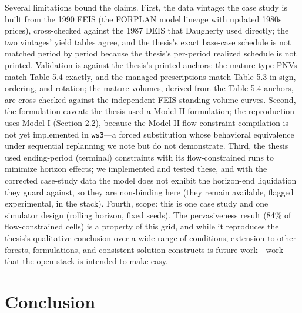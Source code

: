 \documentclass[12pt]{article}
\begin{document}
Several limitations bound the claims. First, the data vintage: the case study is built from the 1990 FEIS (the FORPLAN model lineage with updated 1980s prices), cross-checked against the 1987 DEIS that Daugherty used directly; the two vintages' yield tables agree, and the thesis's exact base-case schedule is not matched period by period because the thesis's per-period realized schedule is not printed. Validation is against the thesis's printed anchors: the mature-type PNVs match Table 5.4 exactly, and the managed prescriptions match Table 5.3 in sign, ordering, and rotation; the mature volumes, derived from the Table 5.4 anchors, are cross-checked against the independent FEIS standing-volume curves. Second, the formulation caveat: the thesis used a Model II formulation; the reproduction uses Model I (Section 2.2), because the Model II flow-constraint compilation is not yet implemented in \texttt{ws3}---a forced substitution whose behavioral equivalence under sequential replanning we note but do not demonstrate. Third, the thesis used ending-period (terminal) constraints with its flow-constrained runs to minimize horizon effects; we implemented and tested these, and with the corrected case-study data the model does not exhibit the horizon-end liquidation they guard against, so they are non-binding here (they remain available, flagged experimental, in the stack). Fourth, scope: this is one case study and one simulator design (rolling horizon, fixed seeds). The pervasiveness result (84\% of flow-constrained cells) is a property of this grid, and while it reproduces the thesis's qualitative conclusion over a wide range of conditions, extension to other forests, formulations, and consistent-solution constructs is future work---work that the open stack is intended to make easy.

\section{Conclusion}
\end{document}
